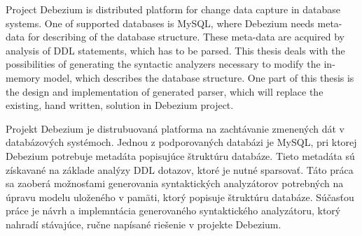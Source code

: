  
	\abstractpage
    

	Project Debezium is distributed platform for change data capture in database systems. One of supported databases is MySQL, where Debezium needs meta-data for describing of the database structure. These meta-data are acquired by analysis of DDL statements, which has to be parsed. This thesis deals with the possibilities of generating the syntactic analyzers necessary to modify the in-memory model, which describes the database structure. One part of this thesis is the design and implementation of generated parser, which will replace the existing, hand written, solution in Debezium project.

	\baselineskip

	\noindent
    Projekt Debezium je distrubuovaná platforma na zachtávanie zmenených dát v databázových systémoch. Jednou z podporovaných databázi je MySQL, pri ktorej Debezium potrebuje metadáta popisujúce štruktúru databáze. Tieto metadáta sú získavané na základe analýzy DDL dotazov, ktoré je nutné sparsovať. Táto práca sa zaoberá možnosťami generovania syntaktických analyzátorov potrebných na úpravu modelu uloženého v pamäti, ktorý popisuje štruktúru databáze. Súčasťou práce je návrh a implemntácia generovaného syntaktického analyzátoru, ktorý nahradí stávajúce, ručne napísané riešenie v projekte Debezium.
